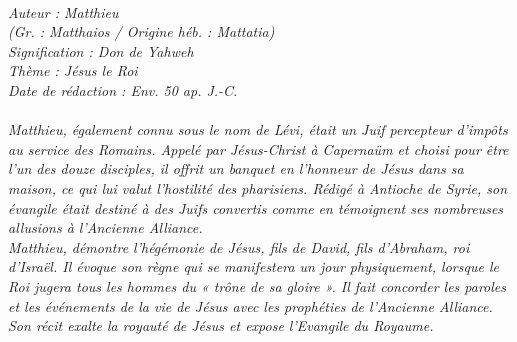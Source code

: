 \BFont
\noindent\hrulefill
{\footnotesize
\textit{
\bigskip
{\centering{}
\\Auteur : Matthieu
\\(Gr. : Matthaios / Origine héb. : Mattatia)
\\Signification : Don de Yahweh
\\Thème : Jésus le Roi
\\Date de rédaction : Env. 50 ap. J.-C.\\}
}
\textit{
\\Matthieu, également connu sous le nom de Lévi, était un Juif percepteur d'impôts au service des Romains. Appelé par Jésus-Christ à Capernaüm et choisi pour être l'un des douze disciples, il offrit un banquet en l'honneur de Jésus dans sa maison, ce qui lui valut l'hostilité des pharisiens. Rédigé à Antioche de Syrie, son évangile était destiné à des Juifs
convertis comme en témoignent ses nombreuses allusions à l'Ancienne Alliance.
\\Matthieu, démontre l'hégémonie de Jésus, fils de David, fils d'Abraham, roi d'Israël. Il évoque son règne qui se manifestera un jour physiquement, lorsque le Roi jugera tous les hommes du « trône de sa gloire ». Il fait concorder les paroles et les événements de la vie de Jésus avec les prophéties de l'Ancienne Alliance.
\\Son récit exalte la royauté de Jésus et expose l'Evangile du Royaume.\bigskip
}
}
\par\nobreak\noindent\hrulefill
